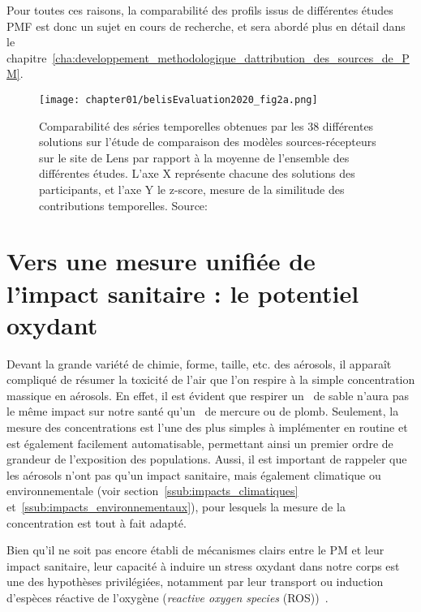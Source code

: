 Pour toutes ces raisons, la comparabilité des profils issus de différentes études PMF
est donc un sujet en cours de recherche, et sera abordé plus en détail dans le
chapitre~\ref{cha:developpement_methodologique_dattribution_des_sources_de_PM}.

\begin{figure}[ht]
    \centering
    \texttt{[image: chapter01/belisEvaluation2020\_fig2a.png]}
    \caption{Comparabilité des séries temporelles obtenues par les 38 différentes solutions
    sur l'étude de comparaison des modèles sources-récepteurs sur le site de Lens par
    rapport à la moyenne de l'ensemble des différentes études. L'axe X représente chacune des
    solutions des participants, et l'axe Y le z-score, mesure de la similitude des
contributions temporelles. Source: \textcite{belisEvaluation2020}}%
    \label{fig:chapter01/belisEvaluation2020_fig2a}
\end{figure}

\section{Vers une mesure unifiée de l'impact sanitaire : le potentiel oxydant}%
\label{sec:le_potentiel_oxydant_des_aerosols}

Devant la grande variété de chimie, forme, taille, etc. des aérosols, il apparaît
compliqué de résumer la toxicité de l'air que l'on respire à la simple concentration
massique en aérosols. En effet, il est évident que respirer un~\si{\ugm} de sable n'aura
pas le même impact sur notre santé qu'un~\si{\ugm} de mercure ou de plomb.  Seulement, la
mesure des concentrations est l'une des plus simples à implémenter en routine et est également
facilement automatisable, permettant ainsi un premier ordre de grandeur de l'exposition
des populations. Aussi, il est important de rappeler que les aérosols n'ont pas qu'un
impact sanitaire, mais également climatique ou environnementale (voir
section~\ref{ssub:impacts_climatiques} et~\ref{ssub:impacts_environnementaux}),
pour lesquels la mesure de la concentration est tout à fait adapté.

Bien qu'il ne soit pas encore établi de mécanismes clairs entre le PM et leur impact
sanitaire, leur capacité à induire un stress oxydant dans notre corps est une des
hypothèses privilégiées, notamment par leur transport ou induction d'espèces réactive de
l'oxygène (\textit{reactive oxygen species}
(ROS))~\autocite{squadritoQuinoid2001,liParticulate2003a,liUltrafine2003,gonzalez-flechaOxidant2004}.

